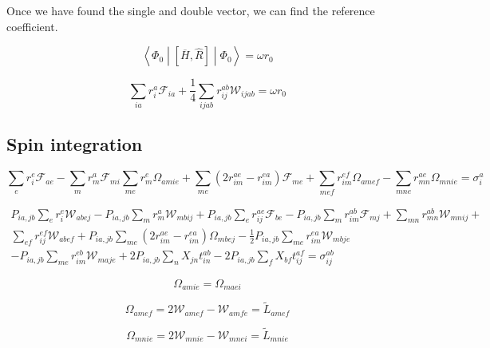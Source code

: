 \documentclass{article}
\begin{document}
Once we have found the single and double vector, we can find the reference coefficient.

\begin{equation}
  \left<\Phi_0\middle|\left[\overline{H}, \hat{R}\right]\middle|\Phi_0\right> = \omega r_0
\end{equation}

\begin{equation}
  \sum_{ia}r_i^a\mathcal{F}_{ia} + \frac{1}{4}\sum_{ijab}r_{ij}^{ab}\mathcal{W}_{ijab} = \omega r_0
\end{equation}

\subsection{Spin integration}

\begin{equation}
  \sum_er_i^e\mathcal{F}_{ae} - \sum_mr_m^a\mathcal{F}_{mi} \sum_{me}r_m^e\Omega_{amie} + \sum_{me}\left(2r_{im}^{ae} - r_{im}^{ea}\right)\mathcal{F}_{me}+ \sum_{mef}r_{im}^{ef}\Omega_{amef} - \sum_{mne} r_{mn}^{ae}\Omega_{mnie} = \sigma_i^a
\end{equation}

\begin{multline}
  P_{ia,jb}\sum_er_i^e\mathcal{W}_{abej} - P_{ia,jb}\sum_mr_m^a\mathcal{W}_{mbij} + P_{ia,jb}\sum_er_{ij}^{ae}\mathcal{F}_{be} - P_{ia,jb}\sum_mr_{im}^{ab}\mathcal{F}_{mj} + \sum_{mn}r_{mn}^{ab}\mathcal{W}_{mnij} + \\
  \sum_{ef}r_{ij}^{ef}\mathcal{W}_{abef} + P_{ia,jb}\sum_{me}\left(2r_{im}^{ae} - r_{im}^{ea}\right)\Omega_{mbej} - \frac{1}{2}P_{ia,jb}\sum_{me}r_{im}^{ea}\mathcal{W}_{mbje} \\
  - P_{ia,jb}\sum_{me}r_{im}^{eb}\mathcal{W}_{maje} + 2P_{ia,jb}\sum_nX_{jn}t_{in}^{ab} - 2P_{ia,jb}\sum_fX_{bf}t_{ij}^{af} = \sigma_{ij}^{ab}
\end{multline}

\begin{equation}
  \Omega_{amie} = \Omega_{maei}
\end{equation}

\begin{equation}
  \Omega_{amef} = 2\mathcal{W}_{amef} - \mathcal{W}_{amfe} = \tilde{L}_{amef}
\end{equation}

\begin{equation}
  \Omega_{mnie} = 2\mathcal{W}_{mnie} - \mathcal{W}_{mnei} = \tilde{L}_{mnie}
\end{equation}
\end{document}
